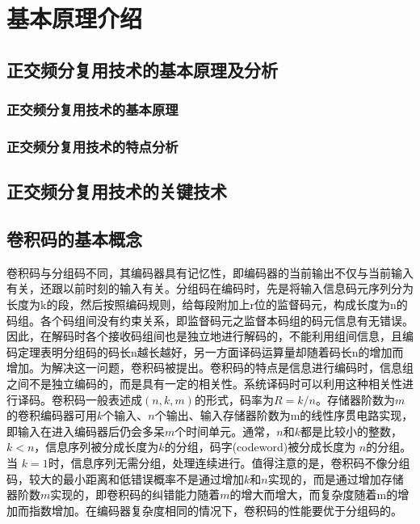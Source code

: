 \chapter{基本原理介绍}
\section{正交频分复用技术的基本原理及分析}
\subsection{正交频分复用技术的基本原理}
\subsection{正交频分复用技术的特点分析}

\section{正交频分复用技术的关键技术}
\section{卷积码的基本概念}
卷积码与分组码不同，其编码器具有记忆性，即编码器的当前输出不仅与当前输入有关，还跟以前时刻的输入有关。分组码在编码时，先是将输入信息码元序列分为长度为k的段，然后按照编码规则，给每段附加上r位的监督码元，构成长度为n的码组。各个码组间没有约束关系，即监督码元之监督本码组的码元信息有无错误。因此，在解码时各个接收码组间也是独立地进行解码的，不能利用组间信息，且编码定理表明分组码的码长n越长越好，另一方面译码运算量却随着码长n的增加而增加。为解决这一问题，卷积码被提出。卷积码的特点是信息进行编码时，信息组之间不是独立编码的，而是具有一定的相关性。系统译码时可以利用这种相关性进行译码。卷积码一般表述成$(n,k,m)$的形式，码率为$R=k/n$。存储器阶数为$m$的卷积编码器可用$k$个输入、$n$个输出、输入存储器阶数为m的线性序贯电路实现，即输入在进入编码器后仍会多呆$m$个时间单元。通常，$n$和$k$都是比较小的整数，$k<n$，信息序列被分成长度为$k$的分组，码字(codeword)被分成长度为 $n$的分组。当 $k=1$时，信息序列无需分组，处理连续进行。值得注意的是，卷积码不像分组码，较大的最小距离和低错误概率不是通过增加$k$和$n$实现的，而是通过增加存储器阶数$m$实现的，即卷积码的纠错能力随着$m$的增大而增大，而复杂度随着m的增加而指数增加。在编码器复杂度相同的情况下，卷积码的性能要优于分组码的。

